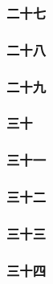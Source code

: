 \subsubsection*{二十七}




\subsubsection*{二十八}




\subsubsection*{二十九}




\subsubsection*{三十}




\subsubsection*{三十一}




\subsubsection*{三十二}




\subsubsection*{三十三}




\subsubsection*{三十四}





























